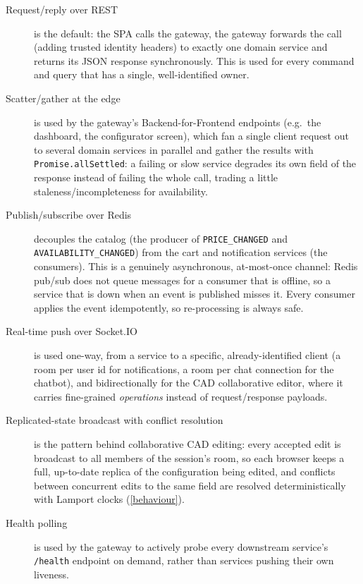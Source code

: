 \begin{description}
  \item[Request/reply over REST] is the default: the SPA calls the gateway,
  the gateway forwards the call (adding trusted identity headers) to exactly one
  domain service and returns its JSON response synchronously. This is used for
  every command and query that has a single, well-identified owner.

  \item[Scatter/gather at the edge] is used by the gateway's
  Backend-for-Frontend endpoints (e.g.\ the dashboard, the configurator
  screen), which fan a single client request out to several domain services in
  parallel and gather the results with \texttt{Promise.allSettled}: a failing
  or slow service degrades its own field of the response instead of failing
  the whole call, trading a little staleness/incompleteness for availability.

  \item[Publish/subscribe over Redis] decouples the catalog (the producer of
  \texttt{PRICE\_CHANGED} and \texttt{AVAILABILITY\_CHANGED}) from the cart and
  notification services (the consumers). This is a genuinely asynchronous,
  at-most-once channel: Redis pub/sub does not queue messages for a consumer
  that is offline, so a service that is down when an event is published
  misses it. Every consumer applies the event
  idempotently, so re-processing is always safe.

  \item[Real-time push over Socket.IO] is used one-way, from a service to a
  specific, already-identified client (a room per user id for notifications, a
  room per chat connection for the chatbot), and bidirectionally for the CAD
  collaborative editor, where it carries fine-grained \emph{operations}
  instead of request/response payloads.

  \item[Replicated-state broadcast with conflict resolution] is the pattern
  behind collaborative CAD editing: every accepted edit is broadcast to all
  members of the session's room, so each browser keeps a full,
  up-to-date replica of the configuration being edited, and conflicts between
  concurrent edits to the same field are resolved deterministically with
  Lamport clocks (\cref{behaviour}).

  \item[Health polling] is used by the gateway to actively probe every
  downstream service's \texttt{/health} endpoint on demand,
  rather than services pushing their own liveness.
\end{description}

